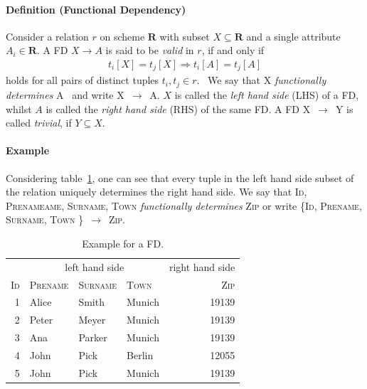 \paragraph{Definition (Functional Dependency)}
Consider a relation \(r\) on scheme \(\boldsymbol{R}\) with subset \(X \subseteq \boldsymbol{R}\) and a single attribute \(A_i \in \boldsymbol{R}\).
A FD \(X \to A\) is said to be \emph{valid} in \(r\), if and only if
\begin{align}
    t_i[X] = t_j[X] \Rightarrow t_i[A] = t_j[A] \label{eq:fd-condition}
\end{align}
holds for all pairs of distinct tuples \(t_i,t_j \in r\).~\cite[p.~21]{ABE19}
We say that \textsc{X} \emph{functionally determines} \textsc{A}~\cite[p.~43]{MAI83} and write \textsc{X}~\( \rightarrow \)~\textsc{A}.
\(X\) is called the \emph{left hand side} (LHS) of a FD, whilst \(A\) is called the \emph{right hand side} (RHS) of the same FD.
A FD \textsc{X}~\( \rightarrow \)~\textsc{Y} is called \emph{trivial}, if \( Y \subseteq X \).\cite[p.~163]{STU16}

\paragraph{Example} Considering table~\ref{tab:fd-example}, one can see that every tuple in the left hand side subset of the relation uniquely determines the right hand side.
We say that \textsc{Id}, \textsc{Prenameame}, \textsc{Surname}, \textsc{Town} \emph{functionally determines} \textsc{Zip} or write \{\textsc{Id}, \textsc{Prename}, \textsc{Surname}, \textsc{Town} \}~\( \rightarrow \)~\textsc{Zip}.~\cite[p.~43]{MAI83}

\begin{table}[ht]
    \centering
    \begin{tabular}{rlllr}
        \toprule
        & \multicolumn{3}{c}{left hand side} & \multicolumn{1}{c}{right hand side} \\ \cmidrule(lr{.25em}){1-4} \cmidrule(l{4.75em}){4-5}
        \textsc{Id} & \textsc{Prename} & \textsc{Surname} & \textsc{Town} & \textsc{Zip} \\
        \midrule
        1 & Alice & Smith & Munich & 19139 \\
        2 & Peter& Meyer & Munich & 19139 \\
        3 & Ana & Parker & Munich & 19139  \\
        4 & John & Pick & Berlin & 12055 \\
        5 & John & Pick & Munich & 19139 \\
        \bottomrule
    \end{tabular}
    \caption{Example for a FD.}\label{tab:fd-example}
\end{table}

